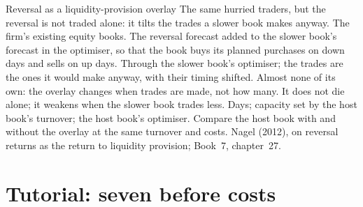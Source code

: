 \begin{strategyfile}{Reversal as a liquidity-provision overlay}\label{strat:s1:short-term-reversal:overlay}
 The same hurried traders, but the reversal is not traded alone: it tilts the trades a slower book makes anyway.
 The firm's existing equity books.
 The reversal forecast added to the slower book's forecast in the optimiser, so that the book buys its planned purchases on down days and sells on
up days.
 Through the slower book's optimiser; the trades are the ones it would make anyway, with their timing shifted.
 Almost none of its own: the overlay changes when trades are made, not how many.
 It does not die alone; it weakens when the slower book trades less.
 Days; capacity set by the host book's turnover; the host book's optimiser.
 Compare the host book with and without the overlay at the same turnover and costs.
 Nagel (2012), on reversal returns as the return to liquidity provision; Book~7, chapter~27.
\end{strategyfile}

\section{Tutorial: seven before costs}\label{tut:s1:short-term-reversal:tut}


